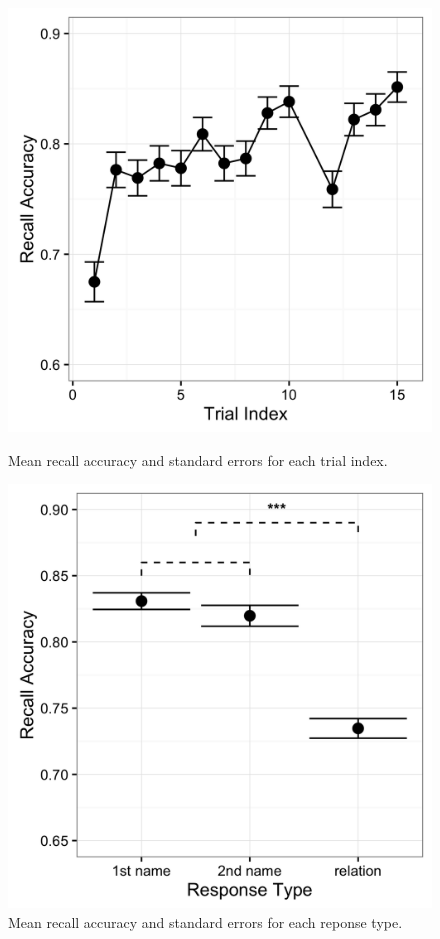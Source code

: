 \documentclass[a4paper,man,natbib,floatsintext,import]{apa6}
\begin{document}
\begin{figure}
\begin{minipage}[t]{.5\textwidth}
\includegraphics[width=.9\linewidth]{figures/conf_stoidx.png}
\caption{Mean recall accuracy and standard errors for each trial index.}
\label{fig:conf_stoidx}
\end{minipage}
\begin{minipage}[t]{.5\textwidth}
\includegraphics[width=.9\linewidth]{figures/conf_respType.png}
\caption{Mean recall accuracy and standard errors for each reponse type.}
\label{fig:conf_respType}
\end{minipage}
\end{figure}
\end{document}
